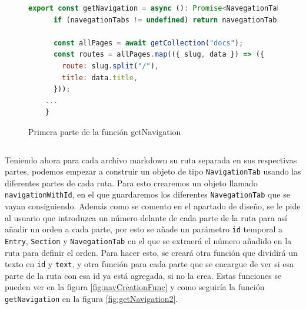 \begin{figure}
    \begin{lstlisting}[language=Javascript]
    export const getNavigation = async (): Promise<NavegationTab[]> => {
      if (navegationTabs != undefined) return navegationTabs;
    
      const allPages = await getCollection("docs");
      const routes = allPages.map(({ slug, data }) => ({
        route: slug.split("/"),
        title: data.title,
      }));
    ...
    }
    \end{lstlisting}
    \caption{Primera parte de la función getNavigation}
    \label{fig:getNavigation1}
\end{figure}


\begin{verbatim}

\end{verbatim}

Teniendo ahora para cada archivo markdown su ruta separada en sus respectivas partes, podemos empezar a construir un objeto de tipo \verb|NavigationTab| usando las diferentes partes de cada ruta. Para esto crearemos un objeto llamado \verb|navigationWithId|, en el que guardaremos los diferentes \verb|NavegationTab| que se vayan consiguiendo. Además como se comento en el apartado de diseño, se le pide al usuario que introduzca un número delante de cada parte de la ruta para así añadir un orden a cada parte, por esto se añade un parámetro \verb|id| temporal a \verb|Entry|, \verb|Section| y \verb|NavegationTab| en el que se extraerá el número añadido en la ruta para definir el orden. Para hacer esto, se creará otra función que dividirá un texto en \verb|id| y \verb|text|, y otra función para cada parte que se encargue de ver si esa parte de la ruta con esa id ya está agregada, si no la crea. Estas funciones se pueden ver en la figura \ref{fig:navCreationFunc} y como seguiría la función \verb|getNavigation| en la figura \ref{fig:getNavigation2}.

